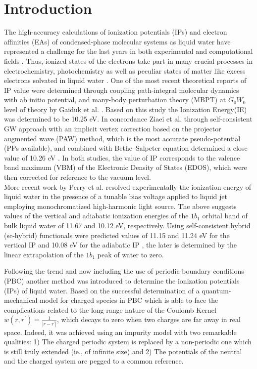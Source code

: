 \documentclass[12pt,a4paper]{article}
\begin{document}
\section{Introduction}

The high-accuracy calculations of ionization potentials (IPs) and electron affinities (EAs) of condensed-phase molecular systems as liquid water have 
represented a challenge for the last years in both experimental and computational fields
\cite{tolle2019charged,gaiduk2018electron,gaiduk2016photoelectron,seidel2016valence}. Thus, ionized states of the electrons take part in many
crucial processes in electrochemistry, photochemistry as well as peculiar states of matter like excess electrons solvated in liquid water
\cite{ambrosio2017electronic}. One of the most recent theoretical reports of IP value were determined through coupling path-integral molecular
dynamics with ab initio potential, and many-body perturbation theory (MBPT) at $G_{0}W_{0}$ level of theory by Gaiduk et al. \cite{gaiduk2018electron}.
Based on this study the Ionization Energy(IE) was determined to be 10.25 eV. In concordance Ziaei et al. 
through self-consistent GW approach with an implicit vertex correction based on the
projector augmented wave (PAW) method, which is the most accurate pseudo-potential \cite{dal2014pseudopotentials} (PPs available),
and combined with Bethe–Salpeter equation determined a close value of 10.26 eV \cite{ziaei2018probing}. In both studies, the value of IP 
corresponds to the valence band maximum (VBM) of the Electronic Density of States (EDOS), which were then corrected for reference to the vacuum level. \\

More recent work by Perry et al. \cite{perry2020ionization} resolved experimentally the ionization energy of liquid water in the presence of a tunable
bias voltage applied to liquid jet employing monochromatized high-harmonic light source. The above suggests values of the vertical and adiabatic
ionization energies of the $1b_1$ orbital band of bulk liquid water of 11.67 and 10.12 eV, respectively. Using 
self-consistent hybrid (sc-hybrid) functionals were predicted values of 11.15 \cite{pham2017electronic} and 11.24 \cite{gaiduk2018electron} 
eV for the vertical IP and 10.08 eV for the adiabatic IP \cite{pham2017electronic, gaiduk2018electron} ,
the later is determined by the linear extrapolation of the $1b_1$ peak of water to zero. 

Following the trend and now including the use of periodic boundary conditions (PBC) another method was introduced \cite{tolle2019charged}
to determine the ionization potentials (IPs) of liquid water. Based on the successful determination of a quantum-mechanical
model for charged species in PBC which is able to face the complications related to the long-range nature of the Coulomb Kernel
$ w(r,r^{'}) = \frac {1}{|r - r^{'}|}$, which decays to zero when two charges are far away in real space. Indeed, it was achieved using an impurity
model with two remarkable qualities: 1) The charged periodic system is replaced by a non-periodic one which is still truly
extended (ie., of infinite size) and 2) The potentials of the neutral and the charged system are pegged to a common reference. \\
\end{document}
